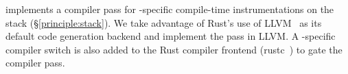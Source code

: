 \projname{} implements a compiler pass for \projname{}-specific
    compile-time instrumentations on the stack (\S\ref{principle:stack}).
We take advantage of Rust's use of LLVM~\cite{llvm} as its default code
    generation backend and implement the pass in LLVM.
A \projname{}-specific compiler switch is also added to the Rust compiler
    frontend (rustc~\cite{rustc}) to gate the \projname{} compiler pass.
